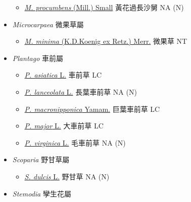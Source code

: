 \begin{itemize}
  \begin{itemize}
        \item[] \href{http://www.theplantlist.org/tpl1.1/search?q=Mecardonia+procumbens}{\textit{M. procumbens} (Mill.) Small}   黃花過長沙舅   NA (N)
  \end{itemize}
 \item[] \textit{Microcarpaea} 微果草屬
                                
  \begin{itemize}
        \item[] \href{http://www.theplantlist.org/tpl1.1/search?q=Microcarpaea+minima}{\textit{M. minima} (K.D.Koenig ex Retz.) Merr.}   微果草   NT
  \end{itemize}
 \item[] \textit{Plantago} 車前屬
                                
  \begin{itemize}
        \item[] \href{http://www.theplantlist.org/tpl1.1/search?q=Plantago+asiatica}{\textit{P. asiatica} L.}   車前草   LC
        \item[] \href{http://www.theplantlist.org/tpl1.1/search?q=Plantago+lanceolata}{\textit{P. lanceolata} L.}   長葉車前草   NA (N)
        \item[] \href{http://www.theplantlist.org/tpl1.1/search?q=Plantago+macronipponica}{\textit{P. macronipponica} Yamam.}   巨葉車前草   LC
        \item[] \href{http://www.theplantlist.org/tpl1.1/search?q=Plantago+major}{\textit{P. major} L.}   大車前草   LC
        \item[] \href{http://www.theplantlist.org/tpl1.1/search?q=Plantago+virginica}{\textit{P. virginica} L.}   毛車前草   NA (N)
  \end{itemize}
 \item[] \textit{Scoparia} 野甘草屬
                                
  \begin{itemize}
        \item[] \href{http://www.theplantlist.org/tpl1.1/search?q=Scoparia+dulcis}{\textit{S. dulcis} L.}   野甘草   NA (N)
  \end{itemize}
 \item[] \textit{Stemodia} 孿生花屬
                                

\end{itemize}
